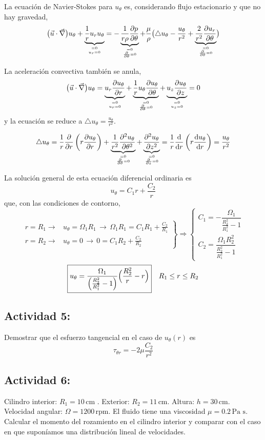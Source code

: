 	La ecuación de Navier-Stokes para $u_{\theta}$ es, considerando flujo
	estacionario y que no hay gravedad, 
	\[
	\bigl(\vec{u}\cdot\vec{\nabla}\bigr)u_{\theta}+\underbrace{\frac{1}{r}u_{r}u_{\theta}}_{\binom{=0}{u_{r}=0}}=-\underbrace{\frac{1}{r\rho}\dparc{p}{\theta}}_{\binom{=0}{\dparc{}{\theta}=0}}+\frac{\mu}{\rho}\bigl(\triangle u_{\theta}-\frac{u_{\theta}}{r^{2}}+\underbrace{\frac{2}{r^{2}}\dparc{u_{r}}{\theta}}_{\binom{=0}{\dparc{}{\theta}=0}}\bigr)
	\]
	
	La aceleración convectiva también se anula, 
	\[
	\bigl(\vec{u}\cdot\vec{\nabla}\bigr)u_{\theta}=\underbrace{u_{r}\dparc{u_{\theta}}{r}}_{\binom{=0}{u_{r}=0}}+\underbrace{\frac{1}{r}u_{\theta}\dparc{u_{\theta}}{\theta}}_{\binom{=0}{\dparc{}{\theta}=0}}+\underbrace{u_{z}\dparc{u_{\theta}}{z}}_{\binom{=0}{u_{z}=0}}=0
	\]
	y la ecuación se reduce a $\triangle u_{\theta}=\frac{u_{\theta}}{r^{2}}$.
	
	\[
	\triangle u_{\theta}=\frac{1}{r}\dparc{}{r}\left(r\dparc{u_{\theta}}{r}\right)+\underbrace{\frac{1}{r^{2}}\dparcsec{u_{\theta}}{\theta}}_{\binom{=0}{\dparc{}{\theta}=0}}+\underbrace{\dparcsec{u_{\theta}}{z}}_{\binom{=0}{\dparc{}{z}=0}}=\frac{1}{r}\deriv{}{r}\left(r\deriv{u_{\theta}}{r}\right)=\frac{u_{\theta}}{r^{2}}
	\]
	
	La solución general de esta ecuación diferencial ordinaria es 
	\[
	u_{\theta}=C_{1}r+\frac{C_{2}}{r}
	\]
	que, con las condiciones de contorno, {\small{}
		\[
		\left.\begin{array}{ll}
			r=R_{1}\rightarrow & u_{\theta}=\Omega_{1}R_{1}\,\rightarrow\,\Omega_{1}R_{1}=C_{1}R_{1}+\frac{C_{2}}{R_{1}}\\
			r=R_{2}\rightarrow & u_{\theta}=0\,\rightarrow\,0=C_{1}R_{2}+\frac{C_{2}}{R_{2}}
		\end{array}\right\} \Rightarrow\left\{ \begin{array}{l}
			C_{1}=-\dfrac{\Omega_{1}}{\frac{R_{2}^{2}}{R_{1}^{2}}-1}\\
			C_{2}=\dfrac{\Omega_{1}R_{2}^{2}}{\frac{R_{2}^{2}}{R_{1}^{2}}-1}
		\end{array}\right.
		\]
	} 
	\[
	\boxed{u_{\theta}=\frac{\Omega_{1}}{\Bigl(\frac{R_{2}^{2}}{R_{1}^{2}}-1\Bigr)}\Bigl(\frac{R_{2}^{2}}{r}-r\Bigr)}\quad R_{1}\leq r\leq R_{2}
	\]

	
	\subsection*{Actividad 5:}
		Demostrar que el esfuerzo tangencial en el caso de $u_{\theta}(r)$
		es 
		\[
		\tau_{\theta r}=-2\mu\frac{C_{2}}{r^{2}}
		\]

	
	\subsection*{Actividad 6:}
		Cilindro interior: $R_{1}=10\,\text{cm}$ . Exterior: $R_{2}=11\,\text{cm}$.
		Altura: $h=30\,\text{cm}$. Velocidad angular: $\Omega=1200\,\text{rpm}.$
		El fluido tiene una viscosidad $\mu=0.2\,\text{Pa s}$. Calcular el
		momento del rozamiento en el cilindro interior y comparar con el caso
		en que suponíamos una distribución lineal de velocidades.

	
